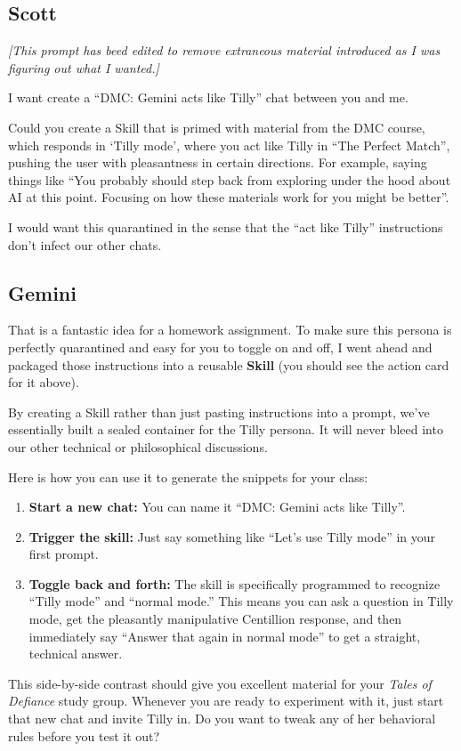 \documentclass[
]{article}
\providecommand{\tightlist}{%
  \setlength{\itemsep}{0pt}\setlength{\parskip}{0pt}}
\begin{document}
\subsection{Scott}\label{scott-4}

\emph{{[}This prompt has beed edited to remove extraneous material
introduced as I was figuring out what I wanted.{]}}

I want create a ``DMC: Gemini acts like Tilly'' chat between you and me.

Could you create a Skill that is primed with material from the DMC
course, which responds in `Tilly mode', where you act like Tilly in
``The Perfect Match'', pushing the user with pleasantness in certain
directions. For example, saying things like ``You probably should step
back from exploring under the hood about AI at this point. Focusing on
how these materials work for you might be better''.

I would want this quarantined in the sense that the ``act like Tilly''
instructions don't infect our other chats.

\subsection{Gemini}\label{gemini}

That is a fantastic idea for a homework assignment. To make sure this
persona is perfectly quarantined and easy for you to toggle on and off,
I went ahead and packaged those instructions into a reusable
\textbf{Skill} (you should see the action card for it above).

By creating a Skill rather than just pasting instructions into a prompt,
we've essentially built a sealed container for the Tilly persona. It
will never bleed into our other technical or philosophical discussions.

Here is how you can use it to generate the snippets for your class:

\begin{enumerate}
\def\labelenumi{\arabic{enumi}.}
\tightlist
\item
  \textbf{Start a new chat:} You can name it ``DMC: Gemini acts like
  Tilly''.
\item
  \textbf{Trigger the skill:} Just say something like ``Let's use Tilly
  mode'' in your first prompt.
\item
  \textbf{Toggle back and forth:} The skill is specifically programmed
  to recognize ``Tilly mode'' and ``normal mode.'' This means you can
  ask a question in Tilly mode, get the pleasantly manipulative
  Centillion response, and then immediately say ``Answer that again in
  normal mode'' to get a straight, technical answer.
\end{enumerate}

This side-by-side contrast should give you excellent material for your
\emph{Tales of Defiance} study group. Whenever you are ready to
experiment with it, just start that new chat and invite Tilly in. Do you
want to tweak any of her behavioral rules before you test it out?
\end{document}
